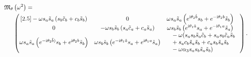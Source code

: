 \begin{align*}
	\mathfrak{M}_{\theta} & \left( \omega^2 \right) = \\
	&
	\begin{pmatrix}[2.5]
		-\omega s_a \tilde{s}_a \left(  s_b \tilde{c}_b + c_b \tilde{s}_b  \right) &
		0 &
		\begin{split}
			&\omega s_a \tilde{s}_a \left(  e^{\mathrm{i}\theta_2\tilde{b}}s_b + e^{-\mathrm{i}\theta_2 b}\tilde{s}_b  \right)
		\end{split} \\
		0 &
		-\omega s_b \tilde{s}_b \left(  s_a \tilde{c}_a + c_a \tilde{s}_a  \right) &
		\begin{split}
			&\omega s_b \tilde{s}_b \left(  e^{\mathrm{i}\theta_1\tilde{a}}s_a + e^{-\mathrm{i}\theta_1 a}\tilde{s}_a  \right) 
		\end{split} \\
		\omega s_a \tilde{s}_a \left(  e^{-\mathrm{i}\theta_2\tilde{b})}s_b + e^{\mathrm{i}\theta_2 b}\tilde{s}_b  \right) &
		\omega s_b \tilde{s}_b \left(  e^{-\mathrm{i}\theta_1\tilde{a}}s_a + e^{\mathrm{i}\theta_1 a}\tilde{s}_a  \right) &
		\begin{split}
			&-\omega ( s_a s_b \tilde{s}_a \tilde{c}_b 
			+ s_a s_b \tilde{c}_a \tilde{s}_b \\ 
			& + s_a c_b \tilde{s}_a \tilde{s}_b
			+ c_a s_b \tilde{s}_a \tilde{s}_b \\
			& - \omega\alpha_3 s_a s_b \tilde{s}_a \tilde{s}_b )
		\end{split}
	\end{pmatrix}.
\end{align*}

